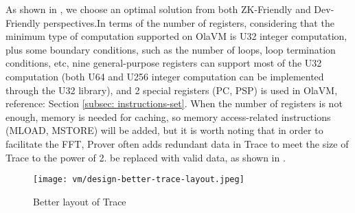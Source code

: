 As shown in , we choose an optimal solution from both ZK-Friendly and Dev-Friendly perspectives.In terms of the number of
registers, considering that the minimum type of computation supported on OlaVM is U32 integer computation, plus some boundary conditions,
such as the number of loops, loop termination conditions, etc, nine general-purpose registers can support most of the U32 computation
(both U64 and U256 integer computation can be implemented through the U32 library), and 2 special registers (PC, PSP) is used in OlaVM, reference: Section \ref{subsec: instructions-set}.
When the number of registers is not enough, memory is needed for caching, so memory access-related instructions
(MLOAD, MSTORE) will be added, but it is worth noting that in order to facilitate the FFT, Prover often adds redundant data in Trace to meet
the size of Trace to the power of 2. be replaced with valid data, as shown in .

\begin{figure}[!ht]
    \centering
    \texttt{[image: vm/design-better-trace-layout.jpeg]}
    \caption{Better layout of Trace}
    \label{fig:design-better-trace-layout}
\end{figure}
